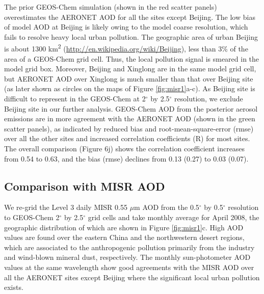  The prior GEOS-Chem simulation (shown in the red scatter panels)
 overestimates the AERONET AOD for all the sites except Beijing.
 The low bias of model AOD at Beijing is likely owing to the model coarse resolution,
 which fails to resolve heavy local urban pollution.
 The geographic area of urban Beijing is about 1300 km\textsuperscript{2}
 (\url{http://en.wikipedia.org/wiki/Beijing}),
 less than 3\% of the area of a GEOS-Chem grid cell.
 Thus, the local pollution signal is smeared in the model grid box.
 Moreover, Beijing and Xinglong are in the same model grid cell,
 but AERONET AOD over Xinglong is much smaller than that over Beijing site
 (as later shown as circles on the maps of Figure \ref{fig:misr1}a-c).
 As Beijing site is difficult to represent in the GEOS-Chem at 2$^{\circ}$ by 2.5$^{\circ}$ resolution,
 we exclude Beijing site in our further analysis.
 GEOS-Chem AOD from the posterior aerosol emissions are in more agreement with the AERONET AOD
 (shown in the green scatter panels),
 as indicated by reduced bias and root-mean-square-error (rmse) over all the other sites and
 increased correlation coefficients (R) for most sites.
 The overall comparison (Figure 6j) shows the correlation coefficient
 increases from 0.54 to 0.63, and the bias (rmse) declines from 0.13 (0.27) to 0.03 (0.07). 

 \subsection{Comparison with MISR AOD }

 We re-grid the Level 3 daily MISR 0.55 $\mu$m AOD from the 0.5$^{\circ}$ by 0.5$^{\circ}$
 resolution to GEOS-Chem 2$^{\circ}$ by 2.5$^{\circ}$ grid cells and take monthly average for April 2008,
 the geographic distribution of which are shown in Figure \ref{fig:misr1}c.
 High AOD values are found over the eastern China and the northwestern desert regions,
 which are associated to the anthropogenic pollution primarily from
 the industry and wind-blown mineral dust, respectively.
 The monthly sun-photometer AOD values at the same wavelength show
 good agreements with the MISR AOD over all the AERONET sites
 except Beijing where the significant local urban pollution exists.

